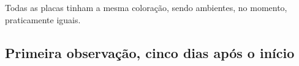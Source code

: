 \documentclass[12pt, titlepage]{article}
\begin{document}
Todas as placas tinham a mesma coloração, sendo ambientes, no momento, praticamente iguais.

\subsection{Primeira observação, cinco dias após o início}
\begin{figure}[H]
	\centering
\end{figure}
\end{document}
